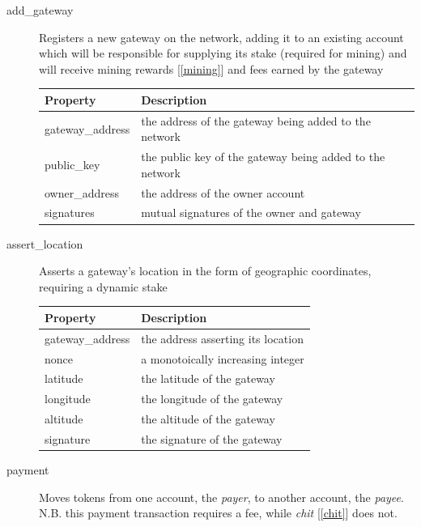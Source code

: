 \documentclass[UTF8, 10pt, nonatbib, nocopyrightspace, reprint]{sigplanconf}
\newcommand{\secref}[1]{[\autoref{#1}]}
\begin{document}
\begin{description}
  \item [add\_gateway] Registers a new gateway on the network, adding it to an existing account which will be responsible for supplying its stake (required for mining) and will receive mining rewards \secref{mining} and fees earned by the gateway

\begin{table}[H]
  \centering
  \begin{tabularx}{\columnwidth}{l X}
    \toprule
    Property & Description \\ \midrule
    gateway\_address & the address of the gateway being added to the network \\
    public\_key & the public key of the gateway being added to the network \\
    owner\_address & the address of the owner account \\
    signatures & mutual signatures of the owner and gateway
  \end{tabularx}
\end{table}

\item [assert\_location] Asserts a gateway's location in the form of geographic coordinates, requiring a dynamic stake

\begin{table}[H]
  \centering
  \begin{tabularx}{\columnwidth}{l X}
      \toprule
      Property & Description \\ \midrule
      gateway\_address & the address asserting its location \\
      nonce & a monotoically increasing integer \\
      latitude & the latitude of the gateway \\
      longitude & the longitude of the gateway \\
      altitude & the altitude of the gateway \\
      signature & the signature of the gateway
  \end{tabularx}
\end{table}

\item [payment] \label{payment} Moves tokens from one account, the \emph{payer}, to another account, the \emph{payee}. N.B. this payment transaction requires a fee, while \emph{chit} \secref{chit} does not.


\end{description}
\end{document}
